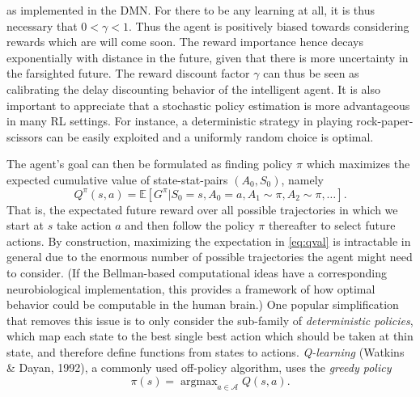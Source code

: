 \documentclass[10pt,letterpaper]{article}
\DeclareMathOperator{\argmax}{argmax}
\begin{document}
as implemented in the DMN. For there to be any learning at all, it is thus necessary that $0 < \gamma < 1$.
Thus the agent is positively biased towards considering rewards which are will
come soon. The reward importance hence decays exponentially
with distance in the future,
given that there is more uncertainty in the farsighted future.
The reward discount factor $\gamma$ can thus be seen as calibrating
the delay discounting behavior of the intelligent agent.
It is also important to appreciate that a stochastic policy estimation
is more advantageous in many RL settings.
For instance, a deterministic strategy in playing rock-paper-scissors can
be easily exploited and a uniformly random choice is optimal.

The agent's goal can then be formulated as finding policy $\pi$ which maximizes the
expected cumulative value of state-stat-pairs $(A_0,S_0)$, namely
\begin{equation}
  \label{eq:qval}
  Q^{\pi}(s,a) = \mathbb E [G^\pi|S_0=s,A_0=a,A_1 \sim \pi,A_2 \sim \pi,\ldots].
\end{equation}
That is, the expectated future reward over all possible trajectories in which we start at $s$ take
action $a$ and then follow the policy $\pi$ thereafter to select future actions.
By construction, maximizing the expectation in  \eqref{eq:qval} is intractable in general
due to the enormous number of possible trajectories the agent might need to
consider.
(If the Bellman-based computational ideas have a corresponding
neurobiological implementation, this provides a framework of how
optimal behavior could be computable in the human brain.)
One popular simplification that removes this issue is to only consider the sub-family of
\textit{deterministic policies}, which map each state to the best single best action which
should be taken at thin state, and therefore define functions from states to actions.
\textit{Q-learning} (Watkins \& Dayan, 1992), a commonly used off-policy algorithm, uses the
\textit{greedy policy}
\begin{equation}
  \pi(s) = \argmax_{a \in \mathcal A}{Q}(s, a).
  \label{eq:qlearning}
\end{equation}
\end{document}
